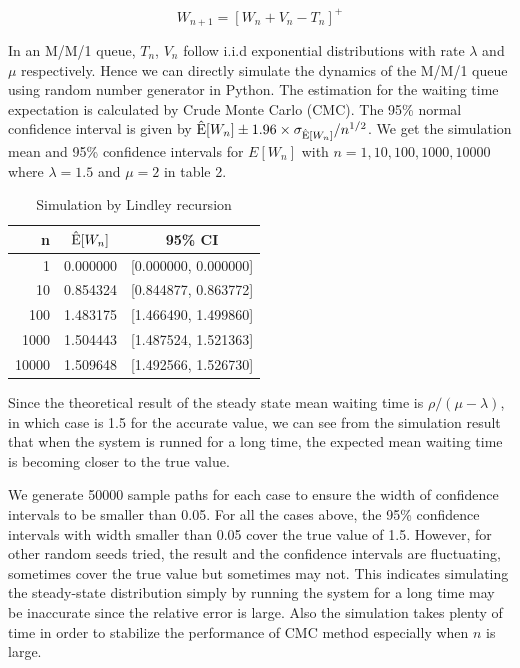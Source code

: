 \documentclass{article}
\begin{document}
\begin{equation}
	W_{n+1}=[W_n+V_n-T_n]^{+}
\end{equation}

In an M/M/1 queue, $T_n$, $V_n$ follow i.i.d exponential distributions with rate $\lambda$ and $\mu$ respectively. Hence we can directly simulate the dynamics of the M/M/1 queue using random number generator in Python. 
The estimation for the waiting time expectation is calculated by Crude Monte Carlo (CMC). 
The 95\% normal confidence interval is given by ${\rm \hat{E}}[W_n] \pm  1.96\times \sigma_{{\rm \hat{E}}[W_n]} / n^{1/2}$.
We get the simulation mean and 95\% confidence intervals for $E[W_n]$ with $n=1,10,100,1000,10000$ where $\lambda = 1.5$ and $\mu = 2$ in table 2. 


\begin{table}[!htbp]
    \small
	\centering
	\begin{tabularx}{0.4\textwidth}{rcc}
		\toprule
        n
		& $\hat{{\rm E}}[W_n]$ 
        & 95\% CI
		\\

        \midrule
        1
        & 0.000000
        & [0.000000, 0.000000]
		

        \\
        \midrule
        10
        & 0.854324
        & [0.844877, 0.863772]
		

        \\
        \midrule
        100
        & 1.483175
        & [1.466490, 1.499860]
		
        \\
        \midrule
        1000
        & 1.504443 
        & [1.487524, 1.521363]
		
		\\
        \midrule
        10000
        & 1.509648
        & [1.492566, 1.526730]
        \\
		\bottomrule
	\end{tabularx}%
	\label{tab:tab1}%
	\caption{Simulation by Lindley recursion}
\end{table}%

Since the theoretical result of the steady state mean waiting time is $\rho/{(\mu - \lambda)}$, in which case is 1.5 for the accurate value, we can see from the simulation result that when the system is runned for a long time, the expected mean waiting time is becoming closer to the true value. 

We generate 50000 sample paths for each case to ensure the width of confidence intervals to be smaller than 0.05. For all the cases above, the 95\% confidence intervals with width smaller than 0.05 cover the true value of 1.5.
However, for other random seeds tried, the result and the confidence intervals are fluctuating, sometimes cover the true value but sometimes may not. This indicates simulating the steady-state distribution simply by running the system for a long time may be inaccurate since the relative error is large. Also the simulation takes plenty of time in order to stabilize the performance of CMC method especially when $n$ is large.
\end{document}
